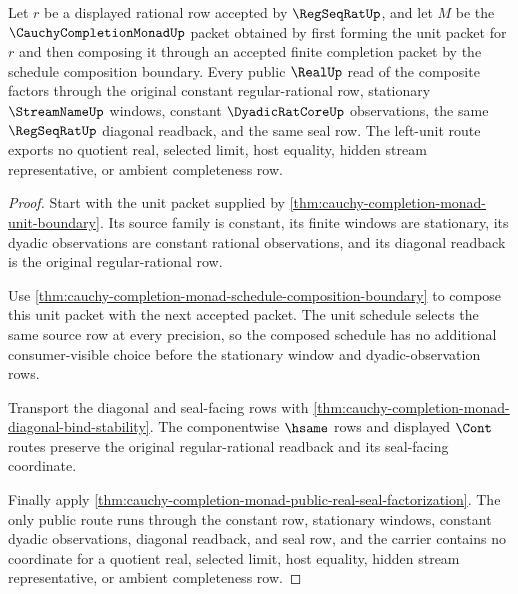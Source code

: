 \begin{theorem}
\label{thm:cauchy-completion-monad-left-unit-factorization}
Let $r$ be a displayed rational row accepted by $\RegSeqRatUp$, and let $M$ be the $\CauchyCompletionMonadUp$ packet obtained by first forming the unit packet for $r$ and then composing it through an accepted finite completion packet by the schedule composition boundary. Every public $\RealUp$ read of the composite factors through the original constant regular-rational row, stationary $\StreamNameUp$ windows, constant $\DyadicRatCoreUp$ observations, the same $\RegSeqRatUp$ diagonal readback, and the same seal row. The left-unit route exports no quotient real, selected limit, host equality, hidden stream representative, or ambient completeness row.
\end{theorem}
\begin{proof}
Start with the unit packet supplied by \autoref{thm:cauchy-completion-monad-unit-boundary}. Its source family is constant, its finite windows are stationary, its dyadic observations are constant rational observations, and its diagonal readback is the original regular-rational row.

Use \autoref{thm:cauchy-completion-monad-schedule-composition-boundary} to compose this unit packet with the next accepted packet. The unit schedule selects the same source row at every precision, so the composed schedule has no additional consumer-visible choice before the stationary window and dyadic-observation rows.

Transport the diagonal and seal-facing rows with \autoref{thm:cauchy-completion-monad-diagonal-bind-stability}. The componentwise $\hsame$ rows and displayed $\Cont$ routes preserve the original regular-rational readback and its seal-facing coordinate.

Finally apply \autoref{thm:cauchy-completion-monad-public-real-seal-factorization}. The only public route runs through the constant row, stationary windows, constant dyadic observations, diagonal readback, and seal row, and the carrier contains no coordinate for a quotient real, selected limit, host equality, hidden stream representative, or ambient completeness row.
\end{proof}

